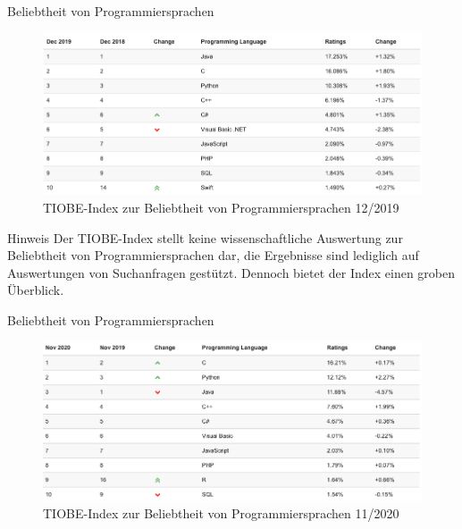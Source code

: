     \begin{frame}{Beliebtheit von Programmiersprachen}
        \begin{figure}
            \centering
            \includegraphics[width=\linewidth,height=0.5\textheight,keepaspectratio]{chapters/04_programming_languages/figures/tiobe_2019.png}
            \caption{TIOBE-Index zur Beliebtheit von Programmiersprachen 12/2019 \cite{fig:tiobe2019}}
        \end{figure}
        
        \begin{alertblock}{Hinweis}
        Der TIOBE-Index stellt keine wissenschaftliche Auswertung zur Beliebtheit von Programmiersprachen dar, die Ergebnisse sind lediglich auf Auswertungen von Suchanfragen gestützt. Dennoch bietet der Index einen groben Überblick.
        \end{alertblock}
    \end{frame}
    
    \begin{frame}{Beliebtheit von Programmiersprachen}
        \begin{figure}
            \centering
            \includegraphics[width=\linewidth,height=0.5\textheight,keepaspectratio]{chapters/04_programming_languages/figures/tiobe_2020.png}
            \caption{TIOBE-Index zur Beliebtheit von Programmiersprachen 11/2020 \cite{fig:tiobe2019}}
        \end{figure}
        
    \end{frame}
    
